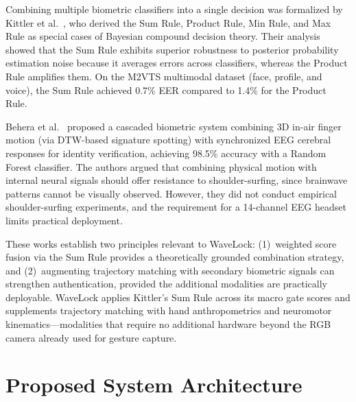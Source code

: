 \documentclass[conference]{IEEEtran}
\begin{document}
Combining multiple biometric classifiers into a single decision was formalized by Kittler et al.~\cite{kittler1998}, who derived the Sum Rule, Product Rule, Min Rule, and Max Rule as special cases of Bayesian compound decision theory. Their analysis showed that the Sum Rule exhibits superior robustness to posterior probability estimation noise because it averages errors across classifiers, whereas the Product Rule amplifies them. On the M2VTS multimodal dataset (face, profile, and voice), the Sum Rule achieved 0.7\% EER compared to 1.4\% for the Product Rule.

Behera et al.~\cite{behera2021} proposed a cascaded biometric system combining 3D in-air finger motion (via DTW-based signature spotting) with synchronized EEG cerebral responses for identity verification, achieving 98.5\% accuracy with a Random Forest classifier. The authors argued that combining physical motion with internal neural signals should offer resistance to shoulder-surfing, since brainwave patterns cannot be visually observed. However, they did not conduct empirical shoulder-surfing experiments, and the requirement for a 14-channel EEG headset limits practical deployment.

These works establish two principles relevant to WaveLock: (1)~weighted score fusion via the Sum Rule provides a theoretically grounded combination strategy, and (2)~augmenting trajectory matching with secondary biometric signals can strengthen authentication, provided the additional modalities are practically deployable. WaveLock applies Kittler's Sum Rule across its macro gate scores and supplements trajectory matching with hand anthropometrics and neuromotor kinematics---modalities that require no additional hardware beyond the RGB camera already used for gesture capture.

\section{Proposed System Architecture}
\label{sec:architecture}
\end{document}
